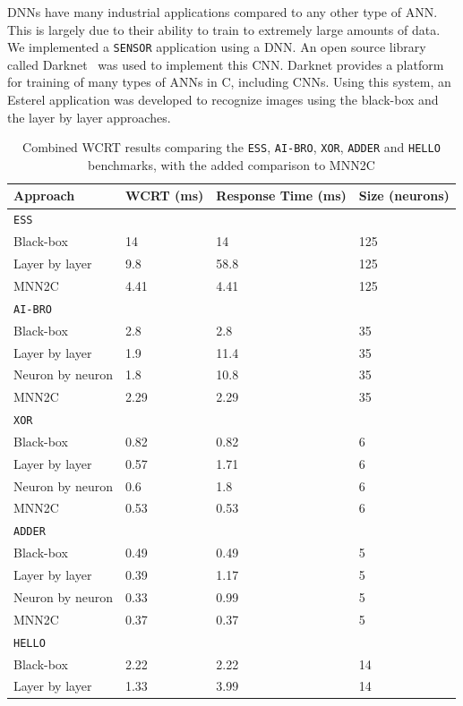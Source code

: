 \acp{DNN} have many industrial applications compared to any other type
of \ac{ANN}. This is largely due to their ability to train to
extremely large amounts of data. We implemented a \texttt{SENSOR}
application using a \ac{DNN}. An open source library called Darknet~\cite{redmon2015real} was used
to implement this \ac{CNN}. Darknet provides a platform for training
of many types of \acp{ANN} in C, including \acp{CNN}. 
Using this system, an Esterel application was developed to recognize images using the black-box and the layer by layer approaches.%

\begin{table}[h]
	\centering
	\caption{Combined \ac{WCRT} results comparing the \texttt{ESS}, \texttt{AI-BRO}, \texttt{XOR}, \texttt{ADDER} and \texttt{HELLO} benchmarks, with the added comparison to \ac{MNN2C}}
	\label{tbl:res-sann}
	\begin{tabular}{|l|l|l|l|}
		\hline
		Approach         & WCRT (ms) & Response Time (ms) & Size (neurons) \\ \hline
		\multicolumn{4}{|l|}{\texttt{ESS}} \\ \hline
		Black-box        & 14  & 14 & 125 \\ 
		Layer by layer   & 9.8  & 58.8 & 125 \\
		MNN2C			 & 4.41 & 4.41 & 125 \\ \hline
		\multicolumn{4}{|l|}{\texttt{AI-BRO}}  \\ \hline
		Black-box        & 2.8  & 2.8 & 35 \\ 
		Layer by layer   & 1.9  & 11.4 & 35 \\ 
		Neuron by neuron & 1.8  & 10.8 & 35 \\ 
		MNN2C			 & 2.29 & 2.29 & 35 \\ \hline
		\multicolumn{4}{|l|}{\texttt{XOR}}  \\ \hline
		Black-box        & 0.82 & 0.82 & 6  \\ 
		Layer by layer   & 0.57 & 1.71 & 6 \\ 
		Neuron by neuron & 0.6  & 1.8 & 6 \\ 
		MNN2C			 & 0.53 & 0.53 & 6 \\ \hline
		\multicolumn{4}{|l|}{\texttt{ADDER}}  \\ \hline
		Black-box        & 0.49 & 0.49 & 5  \\ 
		Layer by layer   & 0.39 & 1.17 & 5 \\ 
		Neuron by neuron & 0.33 & 0.99 & 5 \\ 
		MNN2C			 & 0.37 & 0.37 & 5 \\ \hline
		\multicolumn{4}{|l|}{\texttt{HELLO}}  \\ \hline
		Black-box        & 2.22  & 2.22 & 14 \\ 
		Layer by layer   & 1.33  & 3.99 & 14 \\ \hline
	\end{tabular}
\end{table}

